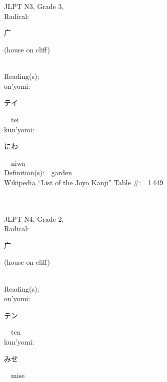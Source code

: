 \begin{multicols}{2}
\ \ \\
{\fontsize{34pt}{40pt}  }\ \ \\  %
{JLPT N3, Grade 3, \\Radical:\ \ {\begin{CJK}{UTF8}{min} 广 \end{CJK}} (house on cliff) } \\
Reading(s):\ \ \\
{\hspace*{1em}}on'yomi:\ \ \\
{\hspace*{2em}}{\begin{CJK}{UTF8}{min} テイ \end{CJK}}\ \ tei\ \ \\
{\hspace*{1em}}kun'yomi:\ \ \\
{\hspace*{2em}}{\begin{CJK}{UTF8}{min} にわ \end{CJK}}\ \ niwa\ \ \\
Definition(s):\ \ garden \\
Wikipedia ``List of the J\=oy\=o Kanji'' Table \#:\ \ 1\,449 \\
\ \ \\
{\fontsize{34pt}{40pt}  }\ \ \\  %
{JLPT N4, Grade 2, \\Radical:\ \ {\begin{CJK}{UTF8}{min} 广 \end{CJK}} (house on cliff) } \\
Reading(s):\ \ \\
{\hspace*{1em}}on'yomi:\ \ \\
{\hspace*{2em}}{\begin{CJK}{UTF8}{min} テン \end{CJK}}\ \ ten\ \ \\
{\hspace*{1em}}kun'yomi:\ \ \\
{\hspace*{2em}}{\begin{CJK}{UTF8}{min} みせ \end{CJK}}\ \ mise\ \ \\

\end{multicols}
